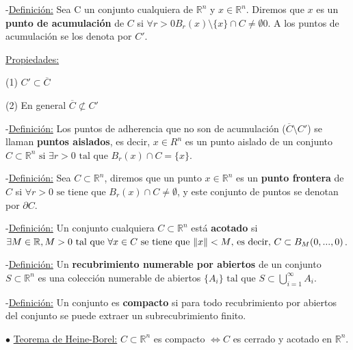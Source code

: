 \documentclass[12pt, titlepage]{article}
\newcommand{\R}{\mathbb{R}}
\begin{document}
\noindent-\underline{Definición:} Sea C un conjunto cualquiera de $\R^n$ y $x \in \R^n$. Diremos que $x$ es un \textbf{punto de acumulación} de $C$ si $\forall{r > 0} B_r(x) \setminus \{x\} \cap C \neq \emptyset 0$. A los puntos de acumulación se los denota por $C'$.
\vspace{3mm}

\underline{Propiedades:}
\vspace{3mm}

\indent \indent (1) $C' \subset \overline{C}$
\vspace{3mm}

\indent \indent (2) En general $\overline{C} \not\subset C'$
\vspace{5mm}

\noindent-\underline{Definición:} Los puntos de adherencia que no son de acumulación ($\overline{C}
 \setminus C'$) se llaman \textbf{puntos aislados}, es decir, $x \in R^n$ es un punto aislado de un conjunto
$C \subset \R^n \text{ si } \exists{r > 0} \text{ tal que } B_r (x) \cap C = \{x\}$.
\vspace{5mm}

\noindent-\underline{Definición:} Sea $C \subset \R^n$, diremos que un punto $x \in \R^n$ es un
 \textbf{punto frontera} de $C$ si $\forall{r > 0} \text{ se tiene que } B_r (x) \cap C \neq \emptyset$, y este 
conjunto de puntos se denotan por $\partial C$.
\vspace{5mm}

\noindent-\underline{Definición:} Un conjunto cualquiera $C \subset \R^n$ está \textbf{acotado} si
$\exists{M \in \R}, \\ M > 0 \text{ tal que } \forall{x \in C} \text{ se tiene que } \|x\| < M \text{, es decir, }
C \subset B_M (0,..., 0)$.
\vspace{5mm}

\noindent-\underline{Definición:} Un \textbf{recubrimiento numerable por abiertos} de un conjunto $S 
\subset \R^n$ es una colección numerable de abiertos $\{A_i\} \text{ tal que } S \subset \displaystyle 
\bigcup_{i=1}^\infty A_i$.
\vspace{3mm}

\noindent-\underline{Definición:} Un conjunto es \textbf{compacto} si para todo recubrimiento por abiertos 
del conjunto se puede extraer un subrecubrimiento finito.
\vspace{5mm}


\noindent$\bullet$ \underline{Teorema de Heine-Borel:} $C \subset \R^n$ es compacto $\iff C$ es cerrado 
y acotado en $\R^n$.
\vspace{3mm}
\end{document}
